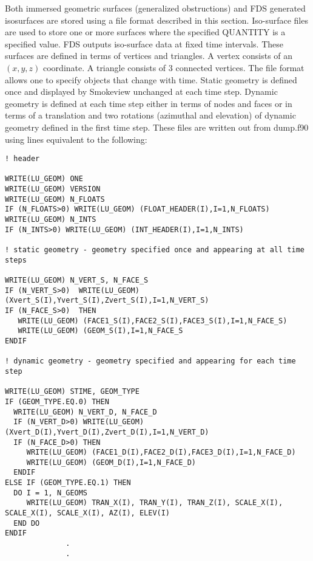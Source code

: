 \documentclass[12pt]{article}
\begin{document}
Both immersed geometric surfaces (generalized obstructions) and FDS generated isosurfaces are stored using a file format described in this section.
Iso-surface files are used to store one or more surfaces where the specified {\ct QUANTITY} is a specified value.
FDS outputs iso-surface data at fixed time intervals.  These surfaces are defined in terms of vertices and triangles.
A vertex consists of an $(x,y,z)$ coordinate. A triangle consists of 3 connected vertices.  The file format allows one to specify objects that change with time. Static geometry is defined once and displayed by Smokeview unchanged at each time step. Dynamic geometry is defined at each time step either in terms of nodes and faces or in terms of a translation and two rotations (azimuthal and elevation) of dynamic geometry defined in the first time step. These files are written out from {\ct dump.f90} using lines equivalent to the following:
\begin{lstlisting}
! header

WRITE(LU_GEOM) ONE
WRITE(LU_GEOM) VERSION
WRITE(LU_GEOM) N_FLOATS
IF (N_FLOATS>0) WRITE(LU_GEOM) (FLOAT_HEADER(I),I=1,N_FLOATS)
WRITE(LU_GEOM) N_INTS
IF (N_INTS>0) WRITE(LU_GEOM) (INT_HEADER(I),I=1,N_INTS)

! static geometry - geometry specified once and appearing at all time steps

WRITE(LU_GEOM) N_VERT_S, N_FACE_S
IF (N_VERT_S>0)  WRITE(LU_GEOM) (Xvert_S(I),Yvert_S(I),Zvert_S(I),I=1,N_VERT_S)
IF (N_FACE_S>0)  THEN
   WRITE(LU_GEOM) (FACE1_S(I),FACE2_S(I),FACE3_S(I),I=1,N_FACE_S)
   WRITE(LU_GEOM) (GEOM_S(I),I=1,N_FACE_S
ENDIF

! dynamic geometry - geometry specified and appearing for each time step

WRITE(LU_GEOM) STIME, GEOM_TYPE
IF (GEOM_TYPE.EQ.0) THEN
  WRITE(LU_GEOM) N_VERT_D, N_FACE_D
  IF (N_VERT_D>0) WRITE(LU_GEOM)(Xvert_D(I),Yvert_D(I),Zvert_D(I),I=1,N_VERT_D)
  IF (N_FACE_D>0) THEN
     WRITE(LU_GEOM) (FACE1_D(I),FACE2_D(I),FACE3_D(I),I=1,N_FACE_D)
     WRITE(LU_GEOM) (GEOM_D(I),I=1,N_FACE_D)
  ENDIF
ELSE IF (GEOM_TYPE.EQ.1) THEN
  DO I = 1, N_GEOMS
     WRITE(LU_GEOM) TRAN_X(I), TRAN_Y(I), TRAN_Z(I), SCALE_X(I), SCALE_X(I), SCALE_X(I), AZ(I), ELEV(I)
  END DO
ENDIF
              .
              .
\end{lstlisting}
\end{document}
